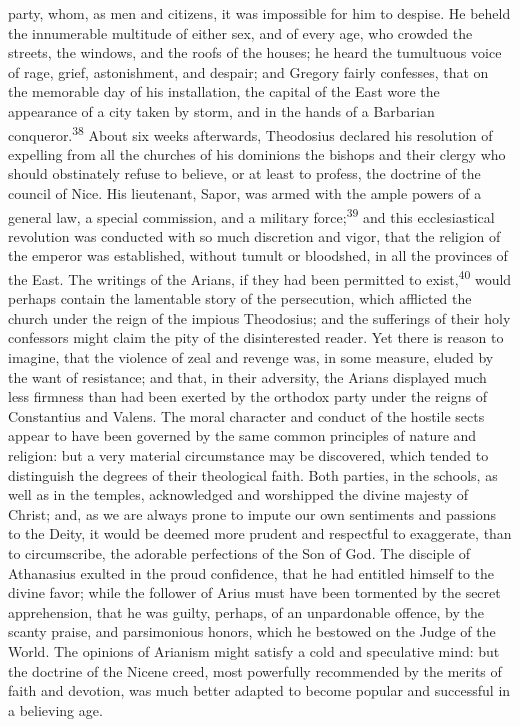 party, whom, as men and citizens, it was impossible for him to
despise. He beheld the innumerable multitude of either sex, and
of every age, who crowded the streets, the windows, and the roofs
of the houses; he heard the tumultuous voice of rage, grief,
astonishment, and despair; and Gregory fairly confesses, that on
the memorable day of his installation, the capital of the East
wore the appearance of a city taken by storm, and in the hands of
a Barbarian conqueror.\textsuperscript{38} About six weeks afterwards, Theodosius
declared his resolution of expelling from all the churches of his
dominions the bishops and their clergy who should obstinately
refuse to believe, or at least to profess, the doctrine of the
council of Nice. His lieutenant, Sapor, was armed with the ample
powers of a general law, a special commission, and a military
force;\textsuperscript{39} and this ecclesiastical revolution was conducted with
so much discretion and vigor, that the religion of the emperor
was established, without tumult or bloodshed, in all the
provinces of the East. The writings of the Arians, if they had
been permitted to exist,\textsuperscript{40} would perhaps contain the lamentable
story of the persecution, which afflicted the church under the
reign of the impious Theodosius; and the sufferings of their holy
confessors might claim the pity of the disinterested reader. Yet
there is reason to imagine, that the violence of zeal and revenge
was, in some measure, eluded by the want of resistance; and that,
in their adversity, the Arians displayed much less firmness than
had been exerted by the orthodox party under the reigns of
Constantius and Valens. The moral character and conduct of the
hostile sects appear to have been governed by the same common
principles of nature and religion: but a very material
circumstance may be discovered, which tended to distinguish the
degrees of their theological faith. Both parties, in the schools,
as well as in the temples, acknowledged and worshipped the divine
majesty of Christ; and, as we are always prone to impute our own
sentiments and passions to the Deity, it would be deemed more
prudent and respectful to exaggerate, than to circumscribe, the
adorable perfections of the Son of God. The disciple of
Athanasius exulted in the proud confidence, that he had entitled
himself to the divine favor; while the follower of Arius must
have been tormented by the secret apprehension, that he was
guilty, perhaps, of an unpardonable offence, by the scanty
praise, and parsimonious honors, which he bestowed on the Judge
of the World. The opinions of Arianism might satisfy a cold and
speculative mind: but the doctrine of the Nicene creed, most
powerfully recommended by the merits of faith and devotion, was
much better adapted to become popular and successful in a
believing age.

